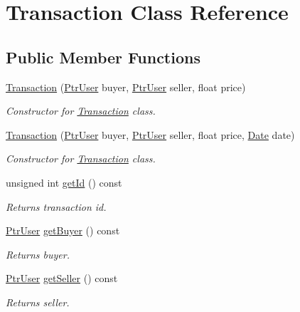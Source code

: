 \hypertarget{class_transaction}{}\section{Transaction Class Reference}
\label{class_transaction}
\subsection*{Public Member Functions}
\begin{DoxyCompactItemize}
\item 
\hyperlink{class_transaction_aa5f33f8848108e5908225957ae7f9153}{Transaction} (\hyperlink{class_ptr_user}{Ptr\+User} buyer, \hyperlink{class_ptr_user}{Ptr\+User} seller, float price)
\begin{DoxyCompactList}\small\item\em Constructor for \hyperlink{class_transaction}{Transaction} class. \end{DoxyCompactList}\item 
\hyperlink{class_transaction_af4584286aca53690abdf7c9762571c51}{Transaction} (\hyperlink{class_ptr_user}{Ptr\+User} buyer, \hyperlink{class_ptr_user}{Ptr\+User} seller, float price, \hyperlink{class_date}{Date} date)
\begin{DoxyCompactList}\small\item\em Constructor for \hyperlink{class_transaction}{Transaction} class. \end{DoxyCompactList}\item 
unsigned int \hyperlink{class_transaction_afa733f8dea36e39279a3eef6919dad97}{get\+Id} () const 
\begin{DoxyCompactList}\small\item\em Returns transaction id. \end{DoxyCompactList}\item 
\hyperlink{class_ptr_user}{Ptr\+User} \hyperlink{class_transaction_a5e18f638b944e6a4a9fdf99b07258969}{get\+Buyer} () const 
\begin{DoxyCompactList}\small\item\em Returns buyer. \end{DoxyCompactList}\item 
\hyperlink{class_ptr_user}{Ptr\+User} \hyperlink{class_transaction_a5be0f0d670cfce197c228c1c1192bf11}{get\+Seller} () const 
\begin{DoxyCompactList}\small\item\em Returns seller. \end{DoxyCompactList}\item 

\end{DoxyCompactItemize}
